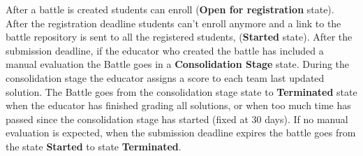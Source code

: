 After a battle is created students can enroll (\textbf{Open for registration} state). After the registration deadline students can't enroll anymore and a link to the battle repository is sent to all the registered students, (\textbf{Started} state). After the submission deadline, if the educator who created the battle has included a manual evaluation the Battle goes in a \textbf{Consolidation Stage} state. During the consolidation stage the educator assigns a score to each team last updated solution. The Battle goes from the consolidation stage state to \textbf{Terminated} state when the educator has finished grading all solutions, or when too much time has passed since the consolidation stage has started (fixed at 30 days). If no manual evaluation is expected, when the submission deadline expires the battle goes from the state \textbf{Started} to state \textbf{Terminated}.
